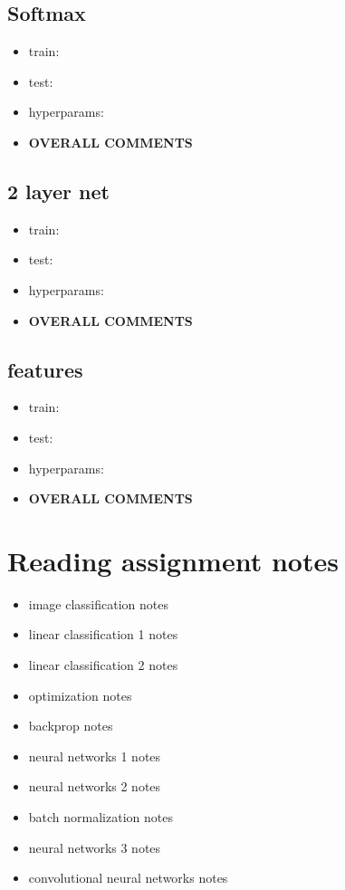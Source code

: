 \documentclass[10pt,letterpaper]{article}
\begin{document}
\begin{solution}
\subsection{Softmax}
\begin{itemize}
\item train:
\item test:
\item hyperparams:
\subitem
\subitem
\item \textbf{OVERALL COMMENTS}
\subitem
\subitem
\subitem
\end{itemize}

\subsection{2 layer net}
\begin{itemize}
\item train:
\item test:
\item hyperparams:
\subitem
\subitem
\item \textbf{OVERALL COMMENTS}
\subitem
\subitem
\subitem
\end{itemize}

\subsection{features}
\begin{itemize}
\item train:
\item test:
\item hyperparams:
\subitem
\subitem
\item \textbf{OVERALL COMMENTS}
\subitem
\subitem
\subitem
\end{itemize}
\end{solution}





\section{Reading assignment notes}
\begin{itemize}
\item image classification
\subitem notes
\item linear classification 1
\subitem notes
\item linear classification 2
\subitem notes
\item optimization
\subitem notes
\item backprop
\subitem notes
\item neural networks 1
\subitem notes
\item neural networks 2
\subitem notes
\item batch normalization 
\subitem notes
\item neural networks 3
\subitem notes
\item convolutional neural networks
\subitem notes
\end{itemize}
\end{document}
